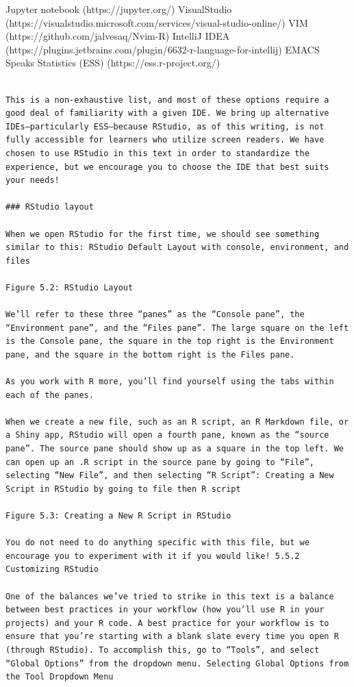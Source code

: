 \documentclass[
  letterpaper,
  DIV=11,
  numbers=noendperiod]{scrreprt}
\begin{document}
Jupyter notebook (https://jupyter.org/) VisualStudio
(https://visualstudio.microsoft.com/services/visual-studio-online/) VIM
(https://github.com/jalvesaq/Nvim-R) IntelliJ IDEA
(https://plugins.jetbrains.com/plugin/6632-r-language-for-intellij)
EMACS Speaks Statistics (ESS) (https://ess.r-project.org/)

\begin{verbatim}

This is a non-exhaustive list, and most of these options require a good deal of familiarity with a given IDE. We bring up alternative IDEs—particularly ESS—because RStudio, as of this writing, is not fully accessible for learners who utilize screen readers. We have chosen to use RStudio in this text in order to standardize the experience, but we encourage you to choose the IDE that best suits your needs!

### RStudio layout

When we open RStudio for the first time, we should see something similar to this: RStudio Default Layout with console, environment, and files

Figure 5.2: RStudio Layout

We’ll refer to these three “panes” as the “Console pane”, the “Environment pane”, and the “Files pane”. The large square on the left is the Console pane, the square in the top right is the Environment pane, and the square in the bottom right is the Files pane.

As you work with R more, you’ll find yourself using the tabs within each of the panes.

When we create a new file, such as an R script, an R Markdown file, or a Shiny app, RStudio will open a fourth pane, known as the “source pane”. The source pane should show up as a square in the top left. We can open up an .R script in the source pane by going to “File”, selecting “New File”, and then selecting “R Script”: Creating a New Script in RStudio by going to file then R script

Figure 5.3: Creating a New R Script in RStudio

You do not need to do anything specific with this file, but we encourage you to experiment with it if you would like! 5.5.2 Customizing RStudio

One of the balances we’ve tried to strike in this text is a balance between best practices in your workflow (how you’ll use R in your projects) and your R code. A best practice for your workflow is to ensure that you’re starting with a blank slate every time you open R (through RStudio). To accomplish this, go to “Tools”, and select “Global Options” from the dropdown menu. Selecting Global Options from the Tool Dropdown Menu


\end{verbatim}
\end{document}
